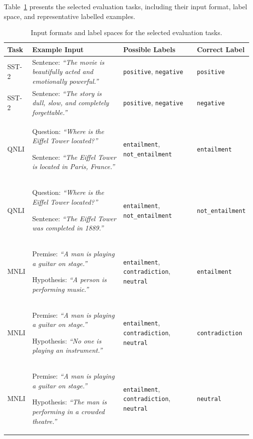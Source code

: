Table~\ref{tab:dataset-examples} presents the selected evaluation tasks, including their input format, label space, and representative labelled examples.

\begin{table}[H]
	\centering
	\scriptsize
	\setlength{\tabcolsep}{3pt}
	\begin{tabularx}{\textwidth}{|>{\raggedright\arraybackslash}p{}|X|>{\raggedright\arraybackslash}p{}|>{\raggedright\arraybackslash}p{}|}
		\hline
		\textbf{Task} & \textbf{Example Input} & \textbf{Possible Labels} & \textbf{Correct Label} \\
		\hline
		SST-2 &
		Sentence: \textit{``The movie is beautifully acted and emotionally powerful.''} &
		\texttt{positive}, \texttt{negative} &
		\texttt{positive} \\
		\hline
		SST-2 &
		Sentence: \textit{``The story is dull, slow, and completely forgettable.''} &
		\texttt{positive}, \texttt{negative} &
		\texttt{negative} \\
		\hline
		QNLI &
		Question: \textit{``Where is the Eiffel Tower located?''}
		
		Sentence: \textit{``The Eiffel Tower is located in Paris, France.''} &
		\texttt{entailment}, \texttt{not\_entailment} &
		\texttt{entailment} \\
		\hline
		QNLI &
		Question: \textit{``Where is the Eiffel Tower located?''}
		
		Sentence: \textit{``The Eiffel Tower was completed in 1889.''} &
		\texttt{entailment}, \texttt{not\_entailment} &
		\texttt{not\_entailment} \\
		\hline
		MNLI &
		Premise: \textit{``A man is playing a guitar on stage.''}
		
		Hypothesis: \textit{``A person is performing music.''} &
		\texttt{entailment}, \texttt{contradiction}, \texttt{neutral} &
		\texttt{entailment} \\
		\hline
		MNLI &
		Premise: \textit{``A man is playing a guitar on stage.''}
		
		Hypothesis: \textit{``No one is playing an instrument.''} &
		\texttt{entailment}, \texttt{contradiction}, \texttt{neutral} &
		\texttt{contradiction} \\
		\hline
		MNLI &
		Premise: \textit{``A man is playing a guitar on stage.''}
		
		Hypothesis: \textit{``The man is performing in a crowded theatre.''} &
		\texttt{entailment}, \texttt{contradiction}, \texttt{neutral} &
		\texttt{neutral} \\
		\hline
	\end{tabularx}
	\caption{Input formats and label spaces for the selected evaluation tasks.}
	\label{tab:dataset-examples}
\end{table}

